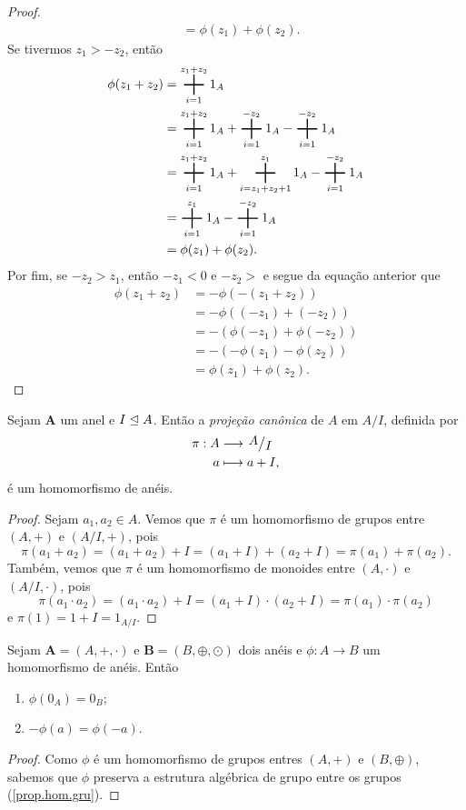 \begin{proof}
\begin{align*}
		&= \phi(z_1)+\phi(z_2).
	\end{align*}
Se tivermos $z_1>-z_2$, então
	\begin{align*}
	\phi(z_1+z_2) &= \bigplus_{i=1}^{z_1+z_2} 1_A \\
		&= \bigplus_{i=1}^{z_1+z_2} 1_A + \bigplus_{i=1}^{-z_2} 1_A - \bigplus_{i=1}^{-z_2} 1_A \\
		&= \bigplus_{i=1}^{z_1+z_2} 1_A + \bigplus_{i=z_1+z_2+1}^{z_1} 1_A - \bigplus_{i=1}^{-z_2} 1_A \\
		&= \bigplus_{i=1}^{z_1} 1_A - \bigplus_{i=1}^{-z_2} 1_A \\
		&= \phi(z_1)+\phi(z_2).
	\end{align*}
Por fim, se $-z_2>z_1$, então $-z_1<0$ e $-z_2>$ e segue da equação anterior que
	\begin{align*}
	\phi(z_1+z_2) &= -\phi(-(z_1+z_2)) \\
		&= -\phi((-z_1)+(-z_2)) \\
		&= -(\phi(-z_1)+\phi(-z_2)) \\
		&= -(-\phi(z_1)-\phi(z_2)) \\
		&= \phi(z_1)+\phi(z_2).
	\end{align*}
\end{proof}

\begin{ex}
	Sejam $\bm A$ um anel e $I \mathrel{\unlhd} A$. Então a \emph{projeção canônica} de $A$ em $A/I$, definida por
	\begin{align*}
	\pi: A &\to \quo{A}{I} \\
		a &\mapsto a+I,
	\end{align*}
é um homomorfismo de anéis.
\end{ex}
\begin{proof}
	Sejam $a_1,a_2 \in A$. Vemos que $\pi$ é um homomorfismo de grupos entre $(A,+)$ e $(A/I,+)$, pois
	\begin{equation*}
	\pi(a_1+a_2) = (a_1+a_2)+I = (a_1+I)+(a_2+I) = \pi(a_1)+\pi(a_2).
	\end{equation*}
Também, vemos que $\pi$ é um homomorfismo de monoides entre $(A,\cdot)$ e $(A/I,\cdot)$, pois
	\begin{equation*}
	\pi(a_1 \cdot a_2) = (a_1 \cdot a_2)+I = (a_1+I) \cdot (a_2+I) = \pi(a_1) \cdot \pi(a_2)
	\end{equation*}
e $\pi(1)=1+I=1_{A/I}$.
\end{proof}

\begin{coro}
	Sejam $\bm A=(A,+,\cdot)$ e $\bm B=(B,\oplus,\odot)$ dois anéis e $\phi: A \to B$ um homomorfismo de anéis. Então
	\begin{enumerate}
	\item $\phi(0_A)=0_B$;
	\item $-\phi(a)=\phi(-a)$.
	\end{enumerate}
\end{coro}
\begin{proof}
	Como $\phi$ é um homomorfismo de grupos entres $(A,+)$ e $(B,\oplus)$, sabemos que $\phi$ preserva a estrutura algébrica de grupo entre os grupos (\ref{prop.hom.gru}).
\end{proof}


